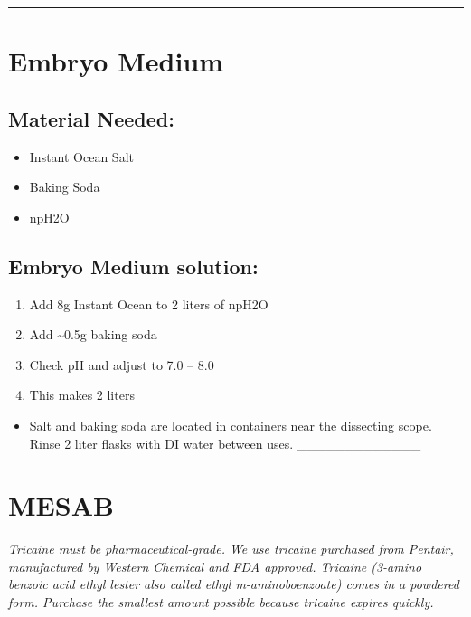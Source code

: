 \documentclass[
]{book}
\providecommand{\tightlist}{%
  \setlength{\itemsep}{0pt}\setlength{\parskip}{0pt}}
\begin{document}
\begin{center}\rule{0.5\linewidth}{0.5pt}\end{center}

\hypertarget{embryo-medium}{%
\section{Embryo Medium}\label{embryo-medium}}

\hypertarget{material-needed-2}{%
\subsection{Material Needed:}\label{material-needed-2}}

\begin{itemize}
\tightlist
\item
  Instant Ocean Salt
\item
  Baking Soda
\item
  npH2O
\end{itemize}

\hypertarget{embryo-medium-solution}{%
\subsection{Embryo Medium solution:}\label{embryo-medium-solution}}

\begin{enumerate}
\def\labelenumi{\arabic{enumi}.}
\tightlist
\item
  Add 8g Instant Ocean to 2 liters of npH2O
\item
  Add \textasciitilde0.5g baking soda
\item
  Check pH and adjust to 7.0 -- 8.0
\item
  This makes 2 liters
\end{enumerate}

\begin{itemize}
\tightlist
\item
  Salt and baking soda are located in containers near the dissecting scope. Rinse 2 liter flasks with DI water between uses.
  \_\_\_\_\_\_\_\_\_\_\_\_\_
\end{itemize}

\hypertarget{mesab}{%
\section{MESAB}\label{mesab}}

\emph{Tricaine must be pharmaceutical-grade. We use tricaine purchased from Pentair, manufactured by Western Chemical and FDA approved. Tricaine (3-amino benzoic acid ethyl lester also called ethyl m-aminoboenzoate) comes in a powdered form. Purchase the smallest amount possible because tricaine expires quickly.}
\end{document}
